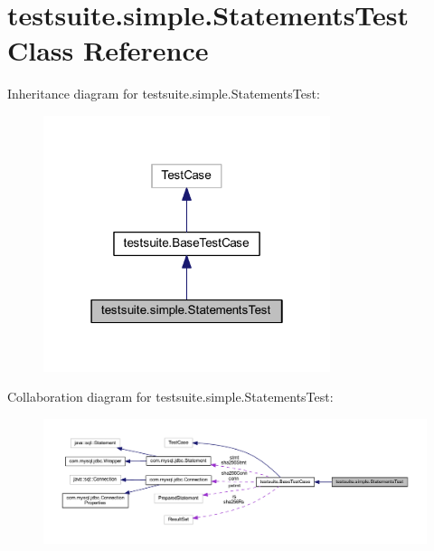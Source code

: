\hypertarget{classtestsuite_1_1simple_1_1_statements_test}{}\section{testsuite.\+simple.\+Statements\+Test Class Reference}
\label{classtestsuite_1_1simple_1_1_statements_test}


Inheritance diagram for testsuite.\+simple.\+Statements\+Test\+:
\nopagebreak
\begin{figure}[H]
\begin{center}
\leavevmode
\includegraphics[width=238pt]{classtestsuite_1_1simple_1_1_statements_test__inherit__graph}
\end{center}
\end{figure}


Collaboration diagram for testsuite.\+simple.\+Statements\+Test\+:
\nopagebreak
\begin{figure}[H]
\begin{center}
\leavevmode
\includegraphics[width=350pt]{classtestsuite_1_1simple_1_1_statements_test__coll__graph}
\end{center}
\end{figure}
